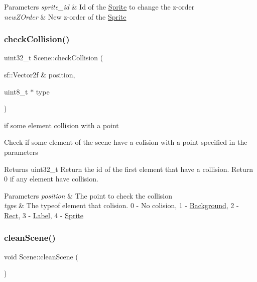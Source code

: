 \begin{DoxyParams}{Parameters}
{\em sprite\+\_\+id} & Id of the \hyperlink{class_sprite}{Sprite} to change the z-\/order \\
\hline
{\em new\+Z\+Order} & New z-\/order of the \hyperlink{class_sprite}{Sprite} \\
\hline
\end{DoxyParams}
\mbox{\label{class_scene_a8a29c60fda35f60e0d2ab54b497955ec}} 
\subsubsection{\texorpdfstring{check\+Collision()}{checkCollision()}}
{\footnotesize\ttfamily uint32\+\_\+t Scene\+::check\+Collision (\begin{DoxyParamCaption}\item[{sf\+::\+Vector2f \&}]{position,  }\item[{uint8\+\_\+t $\ast$}]{type }\end{DoxyParamCaption})}

if some element collision with a point

Check if some element of the scene have a colision with a point specified in the parameters

\begin{DoxyReturn}{Returns}
uint32\+\_\+t Return the id of the first element that have a collision. Return 0 if any element have collision. 
\end{DoxyReturn}

\begin{DoxyParams}{Parameters}
{\em position} & The point to check the collision \\
\hline
{\em type} & The typeof element that colision. 0 -\/ No colision, 1 -\/ \hyperlink{class_background}{Background}, 2 -\/ \hyperlink{class_rect}{Rect}, 3 -\/ \hyperlink{class_label}{Label}, 4 -\/ \hyperlink{class_sprite}{Sprite} \\
\hline
\end{DoxyParams}
\mbox{\label{class_scene_a6c4a04bd6fb848a1bdf8d1a82792c1ef}} 
\subsubsection{\texorpdfstring{clean\+Scene()}{cleanScene()}}
{\footnotesize\ttfamily void Scene\+::clean\+Scene (\begin{DoxyParamCaption}{ }\end{DoxyParamCaption})}

